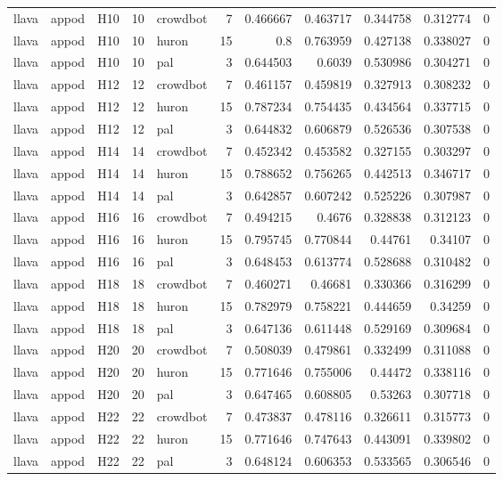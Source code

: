 \begin{longtable}{lllrlrrrrrr}
llava & appod & H10 & 10 & crowdbot & 7 & 0.466667 & 0.463717 & 0.344758 & 0.312774 & 0 \\
llava & appod & H10 & 10 & huron & 15 & 0.8 & 0.763959 & 0.427138 & 0.338027 & 0 \\
llava & appod & H10 & 10 & pal & 3 & 0.644503 & 0.6039 & 0.530986 & 0.304271 & 0 \\
llava & appod & H12 & 12 & crowdbot & 7 & 0.461157 & 0.459819 & 0.327913 & 0.308232 & 0 \\
llava & appod & H12 & 12 & huron & 15 & 0.787234 & 0.754435 & 0.434564 & 0.337715 & 0 \\
llava & appod & H12 & 12 & pal & 3 & 0.644832 & 0.606879 & 0.526536 & 0.307538 & 0 \\
llava & appod & H14 & 14 & crowdbot & 7 & 0.452342 & 0.453582 & 0.327155 & 0.303297 & 0 \\
llava & appod & H14 & 14 & huron & 15 & 0.788652 & 0.756265 & 0.442513 & 0.346717 & 0 \\
llava & appod & H14 & 14 & pal & 3 & 0.642857 & 0.607242 & 0.525226 & 0.307987 & 0 \\
llava & appod & H16 & 16 & crowdbot & 7 & 0.494215 & 0.4676 & 0.328838 & 0.312123 & 0 \\
llava & appod & H16 & 16 & huron & 15 & 0.795745 & 0.770844 & 0.44761 & 0.34107 & 0 \\
llava & appod & H16 & 16 & pal & 3 & 0.648453 & 0.613774 & 0.528688 & 0.310482 & 0 \\
llava & appod & H18 & 18 & crowdbot & 7 & 0.460271 & 0.46681 & 0.330366 & 0.316299 & 0 \\
llava & appod & H18 & 18 & huron & 15 & 0.782979 & 0.758221 & 0.444659 & 0.34259 & 0 \\
llava & appod & H18 & 18 & pal & 3 & 0.647136 & 0.611448 & 0.529169 & 0.309684 & 0 \\
llava & appod & H20 & 20 & crowdbot & 7 & 0.508039 & 0.479861 & 0.332499 & 0.311088 & 0 \\
llava & appod & H20 & 20 & huron & 15 & 0.771646 & 0.755006 & 0.44472 & 0.338116 & 0 \\
llava & appod & H20 & 20 & pal & 3 & 0.647465 & 0.608805 & 0.53263 & 0.307718 & 0 \\
llava & appod & H22 & 22 & crowdbot & 7 & 0.473837 & 0.478116 & 0.326611 & 0.315773 & 0 \\
llava & appod & H22 & 22 & huron & 15 & 0.771646 & 0.747643 & 0.443091 & 0.339802 & 0 \\
llava & appod & H22 & 22 & pal & 3 & 0.648124 & 0.606353 & 0.533565 & 0.306546 & 0 \\

\end{longtable}
